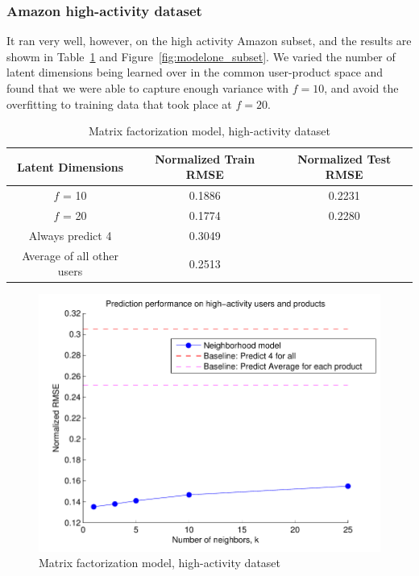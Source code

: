 \documentclass[letterpaper, 11 pt, conference]{ieeeconf}
\begin{document}
\subsubsection{Amazon high-activity dataset}
It ran very well, however, on the high activity Amazon subset, and the results are
showm in Table~\ref{table:modelthree_subset} and 
Figure~\ref{fig:modelone_subset}. We varied the number of latent dimensions being
learned over in the common user-product space and found that we were able to capture
enough variance with $f = 10$, and avoid the overfitting to training data that
took place at $f=20$.

\begin{table}[htb]
\centering
\begin{tabular}{|c|c|c|}
\cline{2-2}

Latent Dimensions & Normalized Train RMSE & Normalized Test RMSE \tabularnewline \hline
$f$ = 10 & 0.1886 & 0.2231 \tabularnewline
$f$ = 20 & 0.1774 & 0.2280 \tabularnewline
\hline
Always predict 4 & 0.3049 \tabularnewline 
Average of all other users & 0.2513 \tabularnewline
\hline
\end{tabular}
\caption{Matrix factorization model, high-activity dataset}
\label{table:modelthree_subset}
\end{table}

\begin{figure}[h]
\includegraphics[scale=0.6]{images/modelone_subset.pdf}
\caption{Matrix factorization model, high-activity dataset}
\label{fig:modelthree_subset}
\end{figure}

\end{document}
